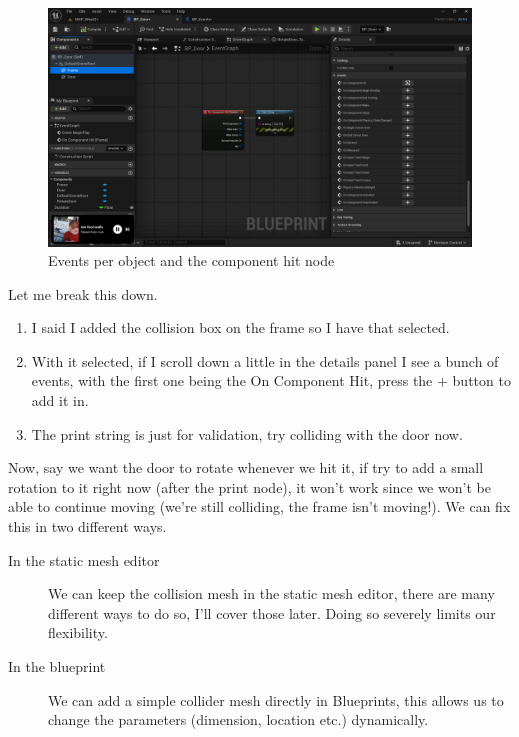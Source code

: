\documentclass[]{article}
\begin{document}
	\begin{figure}[h]
		\centering
		\includegraphics[width=1\linewidth]{week2part2/screenshot007}
		\caption{Events per object and the component hit node}
		\label{fig:screenshot007}
	\end{figure}
	
	Let me break this down.
	\begin{enumerate}
		\item I said I added the collision box on the frame so I have that selected.
		\item With it selected, if I scroll down a little in the details panel I see a bunch of events, with the first one being the On Component Hit, press the $+$ button to add it in.
		\item The print string is just for validation, try colliding with the door now.
	\end{enumerate}
	
	Now, say we want the door to rotate whenever we hit it, if try to add a small rotation to it right now (after the print node), it won't work since we won't be able to continue moving (we're still colliding, the frame isn't moving!). We can fix this in two different ways.
	\begin{description}
		\item[In the static mesh editor] We can keep the collision mesh in the static mesh editor, there are many different ways to do so, I'll cover those later. Doing so severely limits our flexibility.
		\item[In the blueprint] We can add a simple collider mesh directly in Blueprints, this allows us to change the parameters (dimension, location etc.) dynamically.
	\end{description}
	
\end{document}

